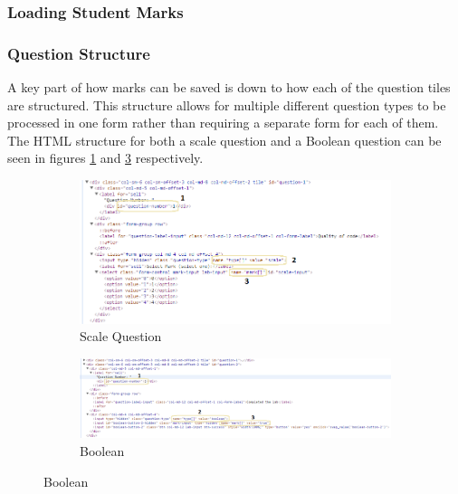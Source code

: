 \documentclass[12pt]{article}  %
\begin{document}
\subsubsection{Loading Student Marks}


\subsubsection{Question Structure}

A key part of how marks can be saved is down to how each of the question tiles are structured. This structure allows for multiple different question types to be processed in one form rather than requiring a separate form for each of them. The HTML structure for both a scale question and a Boolean question can be seen in figures \ref{fig:struct-scale} and \ref{fig:struct-bool} respectively.  

\begin{figure}[H]
\caption{HTML Structure Of Questions}
\centering
\begin{subfigure}[c]{0.45\textwidth}
    \includegraphics[width=1\textwidth]{images/implementation/question-structure-scale.png}
    \caption{Scale Question}
    \label{fig:struct-scale}
\end{subfigure}
\hfill
\begin{subfigure}[c]{0.45\textwidth}
    \includegraphics[width=1\textwidth]{images/implementation/question-structure-boolean.png}
    \caption{Boolean}
    \label{fig:struct-bool}
\end{subfigure}

\end{figure}
\end{document}
